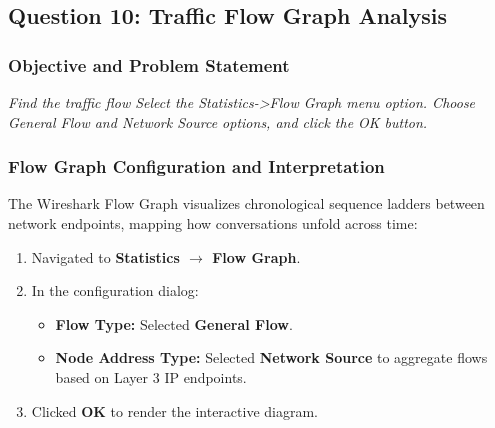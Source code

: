\documentclass[12pt, a4paper]{article}
\begin{document}
\subsection{Question 10: Traffic Flow Graph Analysis}

\subsubsection{Objective and Problem Statement}
\textit{Find the traffic flow Select the Statistics->Flow Graph menu option. Choose General Flow and Network Source options, and click the OK button.}

\subsubsection{Flow Graph Configuration and Interpretation}
The Wireshark Flow Graph visualizes chronological sequence ladders between network endpoints, mapping how conversations unfold across time:
\begin{enumerate}
    \item Navigated to \textbf{Statistics $\rightarrow$ Flow Graph}.
    \item In the configuration dialog:
    \begin{itemize}
        \item \textbf{Flow Type:} Selected \textbf{General Flow}.
        \item \textbf{Node Address Type:} Selected \textbf{Network Source} to aggregate flows based on Layer 3 IP endpoints.
    \end{itemize}
    \item Clicked \textbf{OK} to render the interactive diagram.
\end{enumerate}
\end{document}
